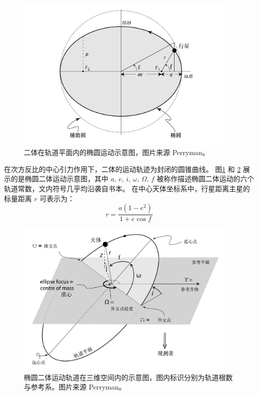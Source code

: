 \begin{figure}[h]
\centering
\includegraphics[width=0.95\textwidth]{figures/appendix/f1_ellipse.pdf}
\caption{二体在轨道平面内的椭圆运动示意图，图片来源 Perryman。}
\label{fig:ellipse}
\end{figure}

在次方反比的中心引力作用下，二体的运动轨迹为封闭的圆锥曲线\cite{Newton1687}。
图\ref{fig:ellipse} 和 \ref{fig:3dorbit} 展示的是椭圆二体运动示意图，其中 $a,\,e,\,i,\,\omega,\,\Omega,\,f$ 
被称作描述椭圆二体运动的六个轨道常数，文内符号几乎均沿袭自书本。
在中心天体坐标系中，行星距离主星的标量距离 $r$ 可表示为：
\begin{equation} \label{radialdistance}
r = \frac{a(1-e^2)}{1+e\cos f}
\end{equation} %

\begin{figure}[t]
\centering
\includegraphics[width=0.95\textwidth]{figures/appendix/f2_3dorbit.pdf}
\caption{椭圆二体运动轨道在三维空间内的示意图，图内标识分别为轨道根数与参考系。图片来源 Perryman。}
\label{fig:3dorbit}
\end{figure}



